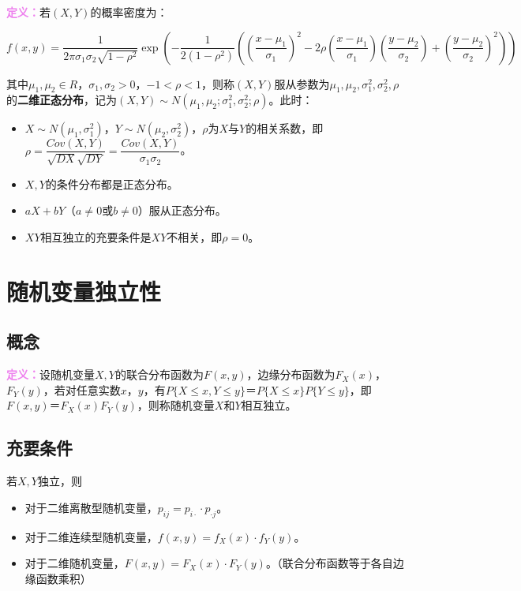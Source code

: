 \documentclass[UTF8, 12pt]{ctexart}
\begin{document}
\textcolor{violet}{\textbf{定义：}}若$(X,Y)$的概率密度为：

{\fontsize{8.2pt}{10pt}$f(x,y)=\dfrac{1}{2\pi\sigma_1\sigma_2\sqrt{1-\rho^2}}\exp\left(-\dfrac{1}{2(1-\rho^2)}\left(\left(\dfrac{x-\mu_1}{\sigma_1}\right)^2-2\rho\left(\dfrac{x-\mu_1}{\sigma_1}\right)\left(\dfrac{y-\mu_2}{\sigma_2}\right)+\left(\dfrac{y-\mu_2}{\sigma_2}\right)^2\right)\right)$}

其中$\mu_1,\mu_2\in R$，$\sigma_1,\sigma_2>0$，$-1<\rho<1$，则称$(X,Y)$服从参数为$\mu_1,\mu_2,\sigma_1^2,\sigma_2^2,\rho$的\textbf{二维正态分布}，记为$(X,Y)\sim N(\mu_1,\mu_2;\sigma_1^2,\sigma_2^2;\rho)$。此时：

\begin{itemize}
    \item $X\sim N(\mu_1,\sigma_1^2)$，$Y\sim N(\mu_2,\sigma_2^2)$，$\rho$为$X$与$Y$的相关系数，即$\rho=\dfrac{Cov(X,Y)}{\sqrt{DX}\sqrt{DY}}=\dfrac{Cov(X,Y)}{\sigma_1\sigma_2}$。
    \item $X,Y$的条件分布都是正态分布。
    \item $aX+bY$（$a\neq0$或$b\neq0$）服从正态分布。
    \item $XY$相互独立的充要条件是$XY$不相关，即$\rho=0$。
\end{itemize}

\section{随机变量独立性}

\subsection{概念}

\textcolor{violet}{\textbf{定义：}}设随机变量$X,Y$的联合分布函数为$F(x,y)$，边缘分布函数为$F_X(x)$，$F_Y(y)$，若对任意实数$x$，$y$，有$P\{X\leqslant x,Y\leqslant y\}＝P\{X\leqslant x\}P\{Y\leqslant y\}$，即$F(x,y)＝F_X(x)F_Y(y)$，则称随机变量$X$和$Y$相互独立。

\subsection{充要条件}

若$X,Y$独立，则

\begin{itemize}
    \item 对于二维离散型随机变量，$p_{ij}=p_{i\cdot}\cdot p_{\cdot j}$。
    \item 对于二维连续型随机变量，$f(x,y)=f_X(x)\cdot f_Y(y)$。
    \item 对于二维随机变量，$F(x,y)=F_X(x)\cdot F_Y(y)$。（联合分布函数等于各自边缘函数乘积）
\end{itemize}
\end{document}
